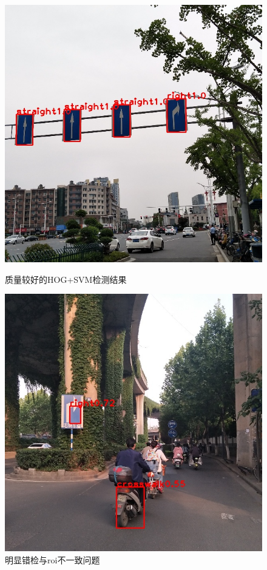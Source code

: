 \documentclass{article}
\begin{document}
\begin{figure}[thbp!]
    \centering
    \begin{minipage}[t]{0.49\linewidth}
        \centering
        \includegraphics[width=1\linewidth, trim=0 50 0 50, clip]{test_results/sign_433_result.jpg}
        \caption{质量较好的HOG+SVM检测结果}
        \label{fig:1}
    \end{minipage}
    \begin{minipage}[t]{0.49\linewidth}
        \centering
        \includegraphics[width=1\linewidth, trim=50 30 50 160, clip]{test_results/sign_120_result.jpg}
        \caption{明显错检与roi不一致问题}
        \label{fig:2}
    \end{minipage}
 \end{figure}
\end{document}
